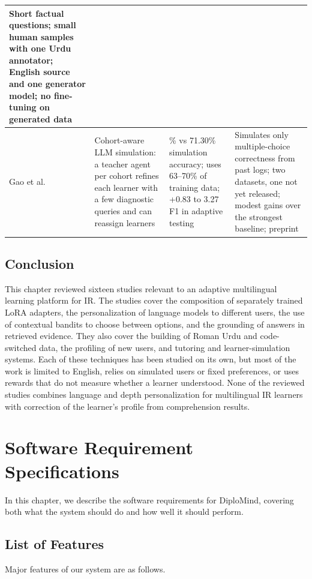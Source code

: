 \documentclass{FastFyp}
\begin{document}
\begin{small}
\begin{longtable}{|>{\raggedright\arraybackslash}p{2.4cm}|>{\raggedright\arraybackslash}p{4.1cm}|>{\raggedright\arraybackslash}p{4.1cm}|>{\raggedright\arraybackslash}p{3.6cm}|}
Short factual questions; small human samples with one Urdu annotator; English source and one generator model; no fine-tuning on generated data \\
\hline
Gao et al. \cite{gao2026edutheater} &
Cohort-aware LLM simulation: a teacher agent per cohort refines each learner with a few diagnostic queries and can reassign learners & 
73.03\% vs 71.30\% simulation accuracy; uses 63--70\% of training data; +0.83 to 3.27 F1 in adaptive testing &
Simulates only multiple-choice correctness from past logs; two datasets, one not yet released; modest gains over the strongest baseline; preprint \\
\hline
\end{longtable}
\end{small} 

\section{Conclusion}
This chapter reviewed sixteen studies relevant to an adaptive multilingual learning platform for IR. The studies cover the composition of separately trained LoRA adapters, the personalization of language models to different users, the use of contextual bandits to choose between options, and the grounding of answers in retrieved evidence. They also cover the building of Roman Urdu and code-switched data, the profiling of new users, and tutoring and learner-simulation systems. Each of these techniques has been studied on its own, but most of the work is limited to English, relies on simulated users or fixed preferences, or uses rewards that do not measure whether a learner understood. None of the reviewed studies combines language and depth personalization for multilingual IR learners with correction of the learner's profile from comprehension results.

\clearpage
 
\chapter{Software Requirement Specifications}
In this chapter, we describe the software requirements for DiploMind, covering both what the system should do and how well it should perform.

\section{List of Features}
Major features of our system are as follows.
\end{document}
